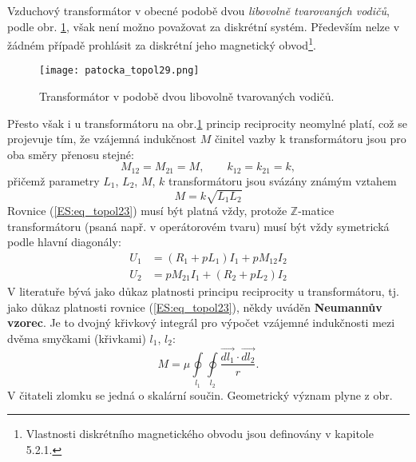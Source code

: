         Vzduchový transformátor v obecné podobě dvou \emph{libovolně tvarovaných vodičů}, podle obr.
        \ref{es:fig_patocka_topol29}, však není možno považovat za diskrétní systém. Především nelze
        v žádném případě prohlásit za diskrétní jeho magnetický obvod\footnote{Vlastnosti
        diskrétního magnetického obvodu jsou definovány v kapitole 5.2.1.}.
        \begin{figure}[ht!]
          \centering  
          \texttt{[image: patocka\_topol29.png]}
          \caption{Transformátor v podobě dvou libovolně tvarovaných vodičů.           
            \cite[s.~63]{Patocka4}} 
          \label{es:fig_patocka_topol29}
        \end{figure}        
        Přesto však i u transformátoru na obr.\ref{es:fig_patocka_topol29} princip reciprocity 
        neomylné platí, což se projevuje tím, že vzájemná indukčnost \(M\) činitel vazby k 
        transformátoru jsou pro oba směry přenosu stejné:
        \begin{equation}\label{ES:eq_topol23}
          M_{12} = M_{21} = M, \qquad k_{12} = k_{21} = k,
        \end{equation} 
        přičemž parametry \(L_1\), \(L_2\), \(M\), \(k\) transformátoru jsou svázány známým vztahem
        \begin{equation}\label{ES:eq_topol24}
          M = k\sqrt{L_1L_2}
        \end{equation} 
        Rovnice (\ref{ES:eq_topol23}) musí být platná vždy, protože \(\mathbb{Z}\)-matice 
        transformátoru (psaná např. v operátorovém tvaru) musí být vždy symetrická podle hlavní 
        diagonály:
        \begin{align}\label{ES:eq_topol25}
          U_1 &= (R_1+pL_1)I_1 + pM_{12}I_2  \nonumber \\
          U_2 &= pM_{21}I_1 + (R_2+pL_2)I_2  
        \end{align} 
        V	literatuře bývá jako důkaz platnosti principu reciprocity u transformátoru, tj. jako 
        důkaz platnosti rovnice (\ref{ES:eq_topol23}), někdy uváděn \textbf{Neumannův vzorec}. Je 
        to dvojný křivkový integrál pro výpočet vzájemné indukčnosti mezi dvěma smyčkami (křivkami) 
        \(l_1\), \(l_2\):
        \begin{equation}\label{ES:eq_topol26}
          M = \mu\oint\limits_{l_1}\oint\limits_{l_2}\frac{\vec{dl_1}\cdot\vec{dl_2}}{r}.
        \end{equation}
        V	čitateli zlomku se jedná o skalární součin. Geometrický význam plyne z obr. 
